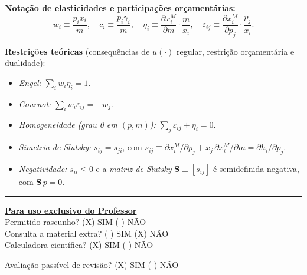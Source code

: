 \documentclass[11pt,addpoints]{exam}
\begin{document}
    \textbf{Notação de elasticidades e participações orçamentárias:}
    \[
        w_i \equiv \frac{p_i x_i}{m},\quad c_i \equiv \frac{p_i \gamma_i}{m},\quad
        \eta_i \equiv \frac{\partial x_i^{M}}{\partial m}\cdot \frac{m}{x_i},\quad
        \varepsilon_{ij} \equiv \frac{\partial x_i^{M}}{\partial p_j}\cdot \frac{p_j}{x_i}.
    \]

    \textbf{Restrições teóricas} (consequências de $u(\cdot)$ regular, restrição orçamentária e dualidade):
    \begin{itemize}[noitemsep,topsep=0pt]
        \item \emph{Engel:} $\sum_i w_i \eta_i = 1$.
        \item \emph{Cournot:} $\sum_i w_i \varepsilon_{ij} = -w_j$.
        \item \emph{Homogeneidade (grau 0 em $(p, m)$):} $\sum_j \varepsilon_{ij} + \eta_i = 0$.
        \item \emph{Simetria de Slutsky:} $s_{ij} = s_{ji}$, com $s_{ij} \equiv \partial x_i^{M}/\partial p_j + x_j\, \partial x_i^{M}/\partial m = \partial h_i/\partial p_j$.
        \item \emph{Negatividade:} $s_{ii} \leq 0$ e a \emph{matriz de Slutsky} $\mathbf{S} \equiv [s_{ij}]$ é semidefinida negativa, com $\mathbf{S}\,p = 0$.
    \end{itemize}

    \vspace{0.5em}
    \hrule
    \vspace{1em}
    \noindent\textbf{\underline{Para uso exclusivo do Professor}} \\[0.2em]

    Permitido rascunho? \hfill (X) SIM \quad (   ) NÃO\\[0.3em]
    Consulta a material extra? \hfill (   ) SIM \quad (X) NÃO\\[0.3em]
    Calculadora científica? \hfill (X) SIM \quad (   ) NÃO

    \vspace{0.6em}
    \noindent Avaliação passível de revisão? \hfill (X) SIM \quad (   ) NÃO

    \newpage
\fi
\end{document}
